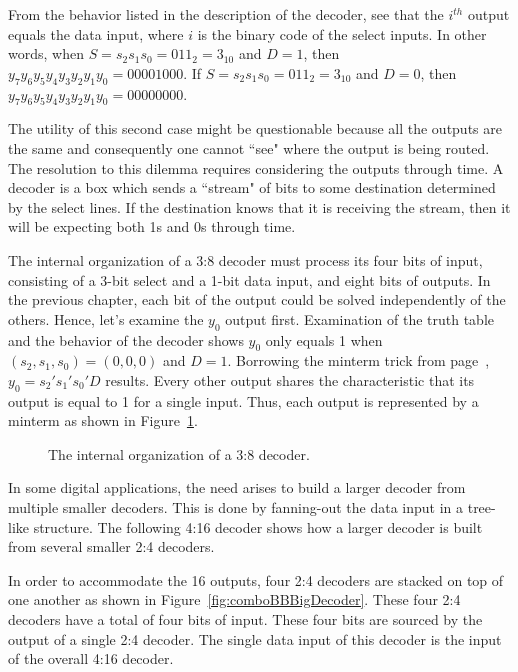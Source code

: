     From the behavior listed in the description of the decoder,
    see that the $i^{th}$ output equals the data input, where
    $i$ is the binary code of the select inputs.  In other
    words, when $S=s_2 s_1 s_0 = 011_2 = 3_{10}$ and $D=1$,
    then $y_7 y_6 y_5 y_4 y_3 y_2 y_1 y_0 = 00001000$.  If
    $S= s_2 s_1 s_0 = 011_2 = 3_{10}$ and $D=0$, then
    $y_7 y_6 y_5 y_4 y_3 y_2 y_1 y_0 = 00000000$.

    The utility of this second case might be questionable because
    all the outputs are the same and consequently one cannot
    ``see" where the output is being routed.  The resolution
    to this dilemma requires considering the outputs
    through time.  A decoder is a box which sends a ``stream" of
    bits to some destination determined by the select lines.
    If the destination knows that it is receiving the stream, then it
    will be expecting both 1s and 0s through time.

    The internal organization of a 3:8 decoder must process its four bits
    of input, consisting of a 3-bit select and a 1-bit data input, and
    eight bits of outputs.  In
    the previous chapter, each bit of the output could
    be solved independently of the others. Hence, let's examine the $y_0$
    output first.  Examination of the truth table and the behavior of
    the decoder shows $y_0$ only equals 1 when
    $(s_2, s_1, s_0) = (0, 0, 0)$ and $D=1$.  Borrowing the minterm
    trick from page~\pageref{page:MinTrick}, $y_0=s_2's_1's_0'D$ results.
    Every other output shares the characteristic that its output is
    equal to 1 for a single input. Thus, each output is represented
    by a minterm as shown in Figure~\ref{fig:comboBB3:8Guts}.

    \begin{figure}[ht]
        \caption{The internal organization of a 3:8 decoder.}
        \label{fig:comboBB3:8Guts}
    \end{figure}

    In some digital applications, the need arises to build a larger decoder
    from multiple smaller decoders.  This is done by fanning-out the data input
    in a tree-like structure.  The following 4:16 decoder shows how a larger decoder is
    built from several smaller 2:4 decoders.

    In order to accommodate the 16 outputs, four 2:4 decoders are stacked
    on top of one another as shown in Figure~\ref{fig:comboBBBigDecoder}.  These
    four 2:4 decoders have a total of four bits of input.  These four bits
    are sourced by the output of a single 2:4 decoder.  The
    single data input of this decoder is the input of the overall 4:16
    decoder.

